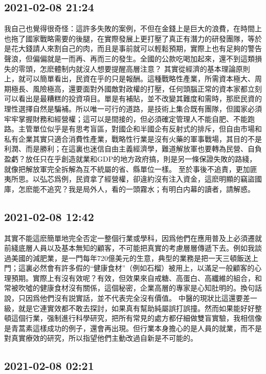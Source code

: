 \documentclass[twocolumn]{ctexart}
\begin{document}
\subsection*{2021-02-08 21:24}

我自己也覺得很奇怪：這許多失敗的案例，不但在金錢上是巨大的浪費，在時間上也拖了國家戰略需要的後腿，在實際發展上更打壓了真正有潛力的研發團隊，等於是花大錢請人來割自己的肉，而且是事前就可以輕鬆預期，實際上也有足夠的警告聲浪，但偏偏就是一而再、再而三的發生。全國的公款吃喝加起來，還不到這類損失的零頭，怎麽體制内就沒人想要提醒高層注意？
其實從經濟的基本理論原則上，就可以簡單看出，民資在乎的只是報酬。這種戰略性產業，所需資本極大、周期極長、風險極高，還要面對外國敵對政權的打壓，任何頭腦正常的資本家都立刻可以看出是最糟糕的投資項目。單是有補貼，並不改變其難度和需時，那麽民資的理性選擇自然是騙補。所以唯一可行的道路，是技術上集合既有團隊，但國家必須牢牢掌握財務和經營權；這可以是間接的，但必須確定管理人不能自肥、不能跑路。主管單位似乎是有思考盲區，對國企和半國企有反射式的排斥，但自由市場和私有企業其實只適合消費性產業，戰略性行業是沒有火藥的軍事戰場，其目的不是利潤、而是勝利；在這裏也迷信自由主義經濟學，難道解放軍也要轉為民營、自負盈虧？放任只在乎創造就業和GDP的地方政府搞，則是另一條保證失敗的路綫，就像把解放軍完全拆解為互不統屬的省、縣單位一樣。
至於事後不追責，更加匪夷所思。以弘芯爲例，民資拿了經營權，卻違約沒有注入資金，這麽明顯的竊盜國庫，怎麽能不追究？我是局外人，看的一頭霧水；有明白内幕的讀者，請解惑。
\subsection*{2021-02-08 12:42}

其實不能這麽簡單地完全否定一整個行業或學科，因爲他們在應用普及上必須遷就前綫底層人員以及基本無知的顧客，不可能把真實的考慮層層傳遞下去。例如我談過美國的減肥業，是一門每年720億美元的生意，典型的業務是把一天三頓飯送上門；這裏必然會有許多假的“健康食材”（例如石榴）被用上，以滿足一般顧客的心理預期。實際上有沒有效呢？有效，但效果來自戒糖、高蛋白、高纖維的組合，和常被吹噓的健康食材沒有關係，這個秘密，企業高層的專家是心知肚明的。換句話說，只因爲他們沒有説實話，並不代表完全沒有價值。
中醫的現狀比這還要差一級，就是它連實效都不敢去探討，如果真有幫助純屬誤打誤撞。然而如果能好好整頓這個行業，强制進行科學研究，把所有常見的處方都仔細做雙盲實驗，我相信像是青蒿素這樣成功的例子，還會再出現。但行業本身擔心的是人員的就業，而不是對真實療效的研究，所以指望他們主動改過自新是不可能的。
\subsection*{2021-02-08 02:21}
\end{document}
